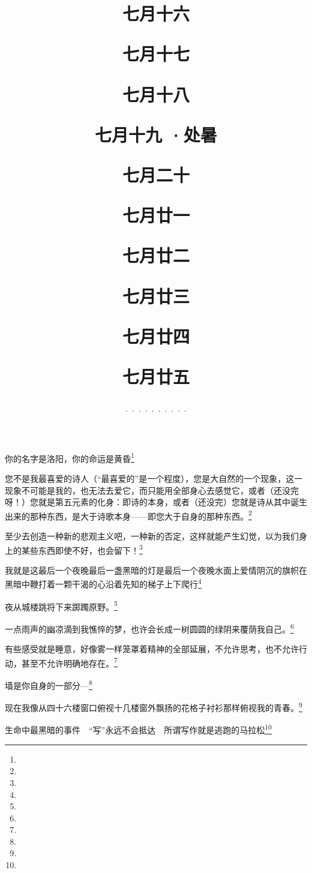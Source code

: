 \title{\date[d=19,m=8,y=2024][year:cn-y,年,month:cn,day:cn,日,·,weekday]·七月十六 }
你的名字是洛阳，你的命运是黄昏\footnote{ }

\title{\date[d=20,m=8,y=2024][year:cn-y,年,month:cn,day:cn,日,·,weekday]·七月十七 }
您不是我最喜爱的诗人（“最喜爱的”是一个程度），您是大自然的一个现象，这一现象不可能是我的，也无法去爱它，而只能用全部身心去感觉它，或者（还没完呀！）您就是第五元素的化身：即诗的本身，或者（还没完）您就是诗从其中诞生出来的那种东西，是大于诗歌本身——即您大于自身的那种东西。\footnote{ }

\title{\date[d=21,m=8,y=2024][year:cn-y,年,month:cn,day:cn,日,·,weekday]·七月十八 }
至少去创造一种新的悲观主义吧，一种新的否定，这样就能产生幻觉，以为我们身上的某些东西即使不好，也会留下！\footnote{ }

\title{\date[d=22,m=8,y=2024][year:cn-y,年,month:cn,day:cn,日,·,weekday]·七月十九 ·处暑}
我就是这最后一个夜晚最后一盏黑暗的灯是最后一个夜晚水面上爱情阴沉的旗帜在黑暗中鞭打着一颗干渴的心沿着先知的梯子上下爬行\footnote{ }

\title{\date[d=23,m=8,y=2024][year:cn-y,年,month:cn,day:cn,日,·,weekday]·七月二十 }
夜从城楼跳将下来踯躅原野。\footnote{ }

\title{\date[d=24,m=8,y=2024][year:cn-y,年,month:cn,day:cn,日,·,weekday]·七月廿一 }
一点雨声的幽凉滴到我憔悴的梦，也许会长成一树圆圆的绿阴来覆荫我自己。\footnote{ }

\title{\date[d=25,m=8,y=2024][year:cn-y,年,month:cn,day:cn,日,·,weekday]·七月廿二 }
有些感受就是睡意，好像雾一样笼罩着精神的全部延展，不允许思考，也不允许行动，甚至不允许明确地存在。\footnote{ }

\title{\date[d=26,m=8,y=2024][year:cn-y,年,month:cn,day:cn,日,·,weekday]·七月廿三 }
墙是你自身的一部分—\footnote{ }

\title{\date[d=27,m=8,y=2024][year:cn-y,年,month:cn,day:cn,日,·,weekday]·七月廿四 }
现在我像从四十六楼窗口俯视十几楼窗外飘扬的花格子衬衫那样俯视我的青春。\footnote{ }

\title{\date[d=28,m=8,y=2024][year:cn-y,年,month:cn,day:cn,日,·,weekday]·七月廿五 }
生命中最黑暗的事件　“写”永远不会抵达　所谓写作就是逃跑的马拉松\footnote{ }

